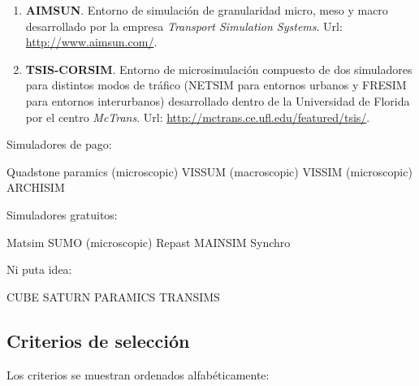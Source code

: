 \begin{enumerate}
	\item \textbf{AIMSUN}. Entorno de simulación de granularidad micro, meso y macro desarrollado por la empresa \textit{Transport Simulation Systems}. Url: \url{http://www.aimsun.com/}.
	\item \textbf{TSIS-CORSIM}. Entorno de microsimulación compuesto de dos simuladores para distintos modos de tráfico (NETSIM para entornos urbanos y FRESIM para entornos interurbanos) desarrollado dentro de la Universidad de Florida por el centro \textit{McTrans}. Url: \url{http://mctrans.ce.ufl.edu/featured/tsis/}.
\end{enumerate}

Simuladores de pago:

Quadstone paramics (microscopic)
VISSUM (macroscopic)
VISSIM (microscopic)
ARCHISIM

Simuladores gratuitos:

Matsim
SUMO (microscopic)
Repast
MAINSIM
Synchro

Ni puta idea:

CUBE
SATURN
PARAMICS
TRANSIMS


\subsection{Criterios de selección}

Los criterios se muestran ordenados alfabéticamente:

